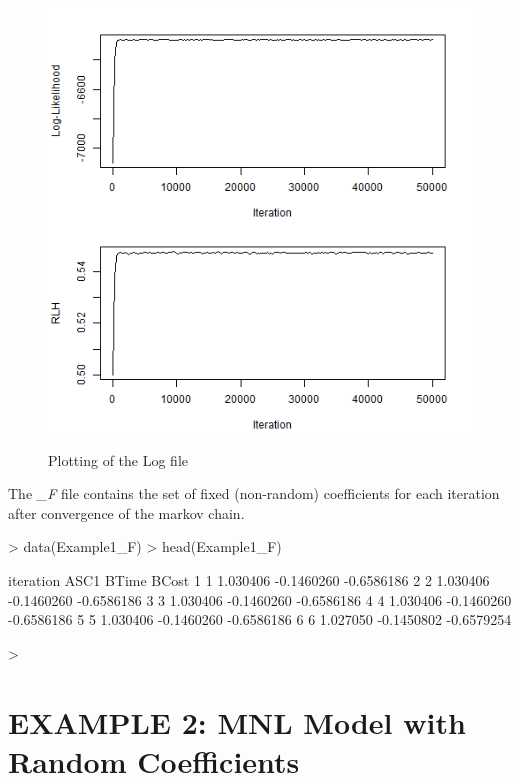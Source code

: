 \documentclass{article}
\begin{document}
\begin{figure}
\caption{Plotting of the Log file}
\includegraphics[scale=0.50]{MNL_logPlot1.png}
\label{logfile1}
\end{figure}

The \emph{\_F} file contains the set of fixed (non-random) coefficients for each iteration after convergence of the markov chain.

\begin{Schunk}
\begin{Sinput}
> data(Example1_F)
> head(Example1_F)
\end{Sinput}
\begin{Soutput}
  iteration     ASC1      BTime      BCost
1         1 1.030406 -0.1460260 -0.6586186
2         2 1.030406 -0.1460260 -0.6586186
3         3 1.030406 -0.1460260 -0.6586186
4         4 1.030406 -0.1460260 -0.6586186
5         5 1.030406 -0.1460260 -0.6586186
6         6 1.027050 -0.1450802 -0.6579254
\end{Soutput}
\begin{Sinput}
> 
\end{Sinput}
\end{Schunk}



\section*{EXAMPLE 2: MNL Model with Random Coefficients}
\end{document}
